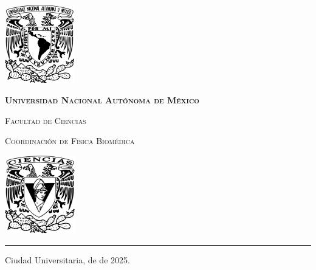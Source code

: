 \documentclass[9pt,letterpaper]{article}
\begin{document}
	
	
	\begin{center}
		\begin{minipage}{3cm}
			\begin{center}
				\includegraphics[height=3.4cm]{../Figuras/Logo_UNAM (1)}
			\end{center}
		\end{minipage}\hfill
		\begin{minipage}{10cm}
			\begin{center}
				{\scshape\LARGE \textbf{Universidad Nacional Autónoma de México} \par}
				{\scshape\Large Facultad de Ciencias\par}
				{\scshape\Large Coordinación de Física Biomédica\par}
			\end{center}
		\end{minipage}\hfill
		\begin{minipage}{3cm}
			\begin{center}
				\includegraphics[height=3.4cm]{../Figuras/Logo_FC (1)}
			\end{center}
		\end{minipage}
	\end{center}
	
	\rule{17cm}{0.1mm}
	
	\hspace{0.5cm}
	
	\parbox{\textwidth}{\raggedleft Ciudad Universitaria,  de  de 2025.}
	
		\hspace{1cm}
	
		\vspace{0.5cm}
	 
\end{document}
